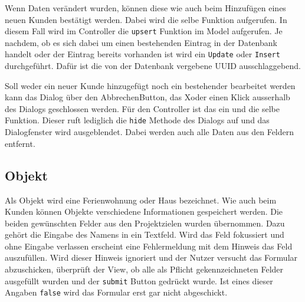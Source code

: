 Wenn Daten verändert wurden, können diese wie auch beim Hinzufügen eines neuen Kunden bestätigt werden. Dabei wird die selbe Funktion aufgerufen. In diesem Fall wird im Controller die \texttt{upsert} Funktion im Model aufgerufen. Je nachdem, ob es sich dabei um einen bestehenden Eintrag in der Datenbank handelt oder der Eintrag bereits vorhanden ist wird ein \texttt{Update} oder \texttt{Insert} durchgeführt. Dafür ist die von der Datenbank vergebene UUID ausschlaggebend.

Soll weder ein neuer Kunde hinzugefügt noch ein bestehender bearbeitet werden kann das Dialog über den \grqq Abbrechen\glqq Button, das \grqq X\glqq oder einen Klick ausserhalb des Dialogs geschlossen werden. Für den Controller ist das ein und die selbe Funktion. Dieser ruft lediglich die \texttt{hide} Methode des Dialogs auf und das Dialogfenster wird ausgeblendet. Dabei werden auch alle Daten aus den Feldern entfernt.





\subsection{Objekt}
Als Objekt wird eine Ferienwohnung oder Haus bezeichnet. Wie auch beim Kunden können Objekte verschiedene Informationen gespeichert werden. Die beiden gewünschten Felder aus den Projektzielen wurden übernommen. Dazu gehört die Eingabe des Namens in ein Textfeld. Wird das Feld fokussiert und ohne Eingabe verlassen erscheint eine Fehlermeldung mit dem Hinweis das Feld auszufüllen. Wird dieser Hinweis ignoriert und der Nutzer versucht das Formular abzuschicken, überprüft der View, ob alle als Pflicht gekennzeichneten Felder ausgefüllt wurden und der \texttt{submit} Button gedrückt wurde. Ist eines dieser Angaben \texttt{false} wird das Formular erst gar nicht abgeschickt.

